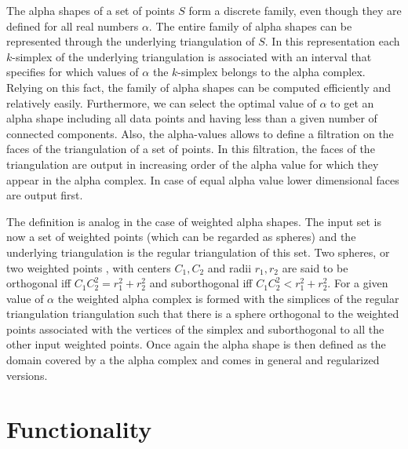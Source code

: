 
The alpha shapes of a  set of points 
$S$ form a discrete family, even though they
are defined for all real numbers $\alpha$.
The entire family of alpha shapes can be represented 
through  the underlying triangulation of $S$. In this representation
each $k$-simplex of the underlying triangulation is associated with an
interval that specifies for which values of $\alpha$ the $k$-simplex
belongs to the alpha complex. Relying on this fact, the family of
 alpha shapes can be computed efficiently and relatively
easily. Furthermore, we can select the optimal value
of  $\alpha$ to get an alpha shape including all data points
and having   less than a given number of connected components.
Also, the alpha-values allows to define a filtration on the
faces of the triangulation of a set of points. 
In this filtration, the faces of the triangulation are output
in increasing order of the alpha value  
for which they appear 
in the alpha complex.  In case of equal alpha value
lower dimensional faces are output first.



The definition is analog in the case of weighted alpha shapes.
The input set is now a set of weighted points (which can be regarded
as spheres) and the underlying triangulation 
is the regular triangulation of this set.
Two spheres, or two weighted points , with centers $C_1, C_2$
and  radii $r_1, r_2 $ are said to be orthogonal iff 
$ C_1C_2 ^2 = r_1^2 + r_2^2$ and suborthogonal
iff  $ C_1C_2 ^2 < r_1^2 + r_2^2$.
For a given value of $\alpha$
the weighted alpha complex is formed with the simplices of the 
regular triangulation triangulation
such that there is a sphere orthogonal to the weighted points associated
with the vertices of the simplex  and suborthogonal to all the other
input weighted points. Once again the alpha shape is then defined as
the domain covered by a the alpha complex and comes in general and
regularized versions.





\section{Functionality \label{I1_SectAlpha_Shape_3}}

